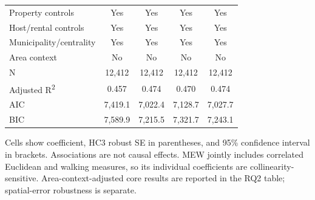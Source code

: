 \begin{table}[p]
\begin{threeparttable}
\begin{tabular}{>{\raggedright\arraybackslash}p{5.7cm}cccc}
Property controls & Yes & Yes & Yes & Yes \\
Host/rental controls & Yes & Yes & Yes & Yes \\
Municipality/centrality & Yes & Yes & Yes & Yes \\
Area context & No & No & No & No \\
N & 12,412 & 12,412 & 12,412 & 12,412 \\
Adjusted R\textsuperscript{2} & 0.457 & 0.474 & 0.470 & 0.474 \\
AIC & 7,419.1 & 7,022.4 & 7,128.7 & 7,027.7 \\
BIC & 7,589.9 & 7,215.5 & 7,321.7 & 7,243.1 \\
\bottomrule
\end{tabular}
\begin{tablenotes}[flushleft]\footnotesize
\item Cells show coefficient, HC3 robust SE in parentheses, and 95\% confidence interval in brackets. Associations are not causal effects. MEW jointly includes correlated Euclidean and walking measures, so its individual coefficients are collinearity-sensitive. Area-context-adjusted core results are reported in the RQ2 table; spatial-error robustness is separate.
\end{tablenotes}
\end{threeparttable}
\end{table}
